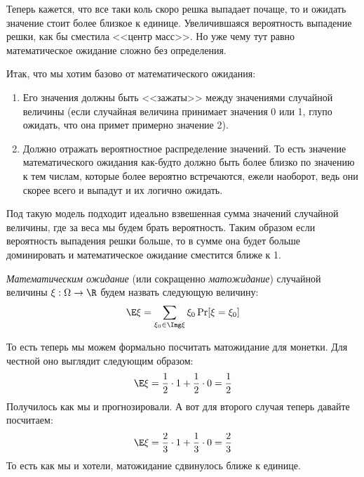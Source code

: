 \begin{center}
\end{center}

Теперь кажется, что все таки коль скоро решка выпадает почаще, то и ожидать значение стоит более близкое к единице. Увеличившаяся вероятность выпадение решки, как бы сместила <<центр масс>>. Но уже чему тут равно математическое ожидание сложно без определения.

Итак, что мы хотим базово от математического ожидания:
\begin{enumerate}
    \item Его значения должны быть <<зажаты>> между значениями случайной величины (если случайная величина принимает значения 0 или 1, глупо ожидать, что она примет примерно значение 2).
    \item Должно отражать вероятностное распределение значений. То есть значение математического ожидания как-будто должно быть более близко по значению к тем числам, которые более вероятно встречаются, ежели наоборот, ведь они скорее всего и выпадут и их логично ожидать.
\end{enumerate}

Под такую модель подходит идеально взвешенная сумма значений случайной величины, где за веса мы будем брать вероятность. Таким образом если вероятность выпадения решки больше, то в сумме она будет больше доминировать и математическое ожидание сместится ближе к 1.

\Def \textit{Математическим ожидание} (или сокращенно \textit{матожидание}) случайной величины $\xi: \Omega \to \R$ будем назвать следующую величину:
\begin{equation*}
    \E \xi = \sum\limits_{\xi_0 \in \Img \xi} \xi_0 \Pr[\xi = \xi_0]
\end{equation*}

То есть теперь мы можем формально посчитать матожидание для монетки. Для честной оно выглядит следующим образом:
\begin{equation*}
    \E \xi = \frac{1}{2} \cdot 1 + \frac{1}{2} \cdot 0 = \frac{1}{2}
\end{equation*}
Получилось как мы и прогнозировали. А вот для второго случая теперь давайте посчитаем:
\begin{equation*}
    \E \xi = \frac{2}{3} \cdot 1 + \frac{1}{3} \cdot 0 = \frac{2}{3}
\end{equation*}
То есть как мы и хотели, матожидание сдвинулось ближе к единице.

